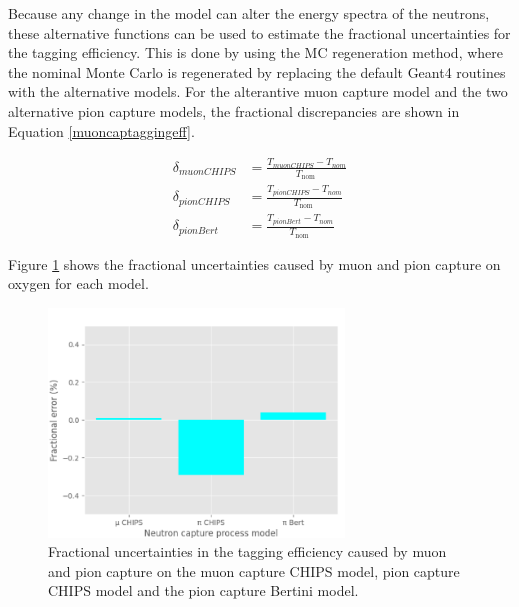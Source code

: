 Because any change in the model can alter the energy spectra of the neutrons, these alternative functions can be used to estimate the fractional uncertainties for the tagging efficiency. This is done by using the MC regeneration method, where the nominal Monte Carlo is regenerated by replacing the default Geant4 routines with the alternative models. For the alterantive muon capture model and the two alternative pion capture models, the fractional discrepancies are shown in Equation \ref{muoncaptaggingeff}.

\begin{equation}
    \begin{aligned}
        \delta_{muon C H I P S} &=\frac{T_{muon C H I P S}-T_{n o m}}{T_{\text {nom }}} \\
        \delta_{pion C H I P S} &=\frac{T_{pion C H I P S}-T_{n o m}}{T_{\text {nom }}} \\
        \delta_{pion B e r t} &=\frac{T_{pion B e r t}-T_{n o m}}{T_{\text {nom }}}
        \end{aligned}
        \label{muoncaptaggingeff}
\end{equation}

Figure \ref{fig:mupicap_uncertainty} shows the fractional uncertainties caused by muon and pion capture on oxygen for each model.

\begin{figure}
\centering
    \includegraphics[width=0.7\textwidth]{Figures/mupicap_uncertainty.png}
\caption{Fractional uncertainties in the tagging efficiency caused by muon and pion capture on the muon capture CHIPS model, pion capture CHIPS model and the pion capture Bertini model.}
\label{fig:mupicap_uncertainty}
\end{figure}

